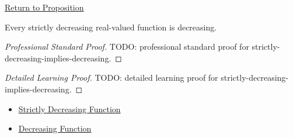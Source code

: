 \newpage
{}
\label{prf:strictly-decreasing-implies-decreasing}

\begin{remark*}[Return]
\hyperref[prop:strictly-decreasing-implies-decreasing]{Return to Proposition}
\end{remark*}

\begin{proposition*}
Every strictly decreasing real-valued function is decreasing.
\end{proposition*}

\begin{proof}[Professional Standard Proof]
\LRAProofBodyStart
TODO: professional standard proof for strictly-decreasing-implies-decreasing.
\end{proof}

\begin{proof}[Detailed Learning Proof]
\LRAProofBodyStart
TODO: detailed learning proof for strictly-decreasing-implies-decreasing.
\end{proof}

\begin{remark*}
\end{remark*}

\begin{dependencies}
\begin{itemize}
  \item \hyperref[def:function-strictly-decreasing]{Strictly Decreasing Function}
  \item \hyperref[def:function-decreasing]{Decreasing Function}
\end{itemize}
\end{dependencies}

\clearpage
